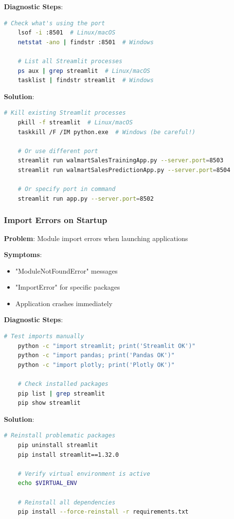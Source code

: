 \textbf{Diagnostic Steps}:
\begin{lstlisting}[language=bash,basicstyle=\color{blue}]
	# Check what's using the port
	lsof -i :8501  # Linux/macOS
	netstat -ano | findstr :8501  # Windows
	
	# List all Streamlit processes
	ps aux | grep streamlit  # Linux/macOS
	tasklist | findstr streamlit  # Windows
\end{lstlisting}

\textbf{Solution}:
\begin{lstlisting}[language=bash,basicstyle=\color{blue}]
	# Kill existing Streamlit processes
	pkill -f streamlit  # Linux/macOS
	taskkill /F /IM python.exe  # Windows (be careful!)
	
	# Or use different port
	streamlit run walmartSalesTrainingApp.py --server.port=8503
	streamlit run walmartSalesPredictionApp.py --server.port=8504
	
	# Or specify port in command
	streamlit run app.py --server.port=8502
\end{lstlisting}

\subsubsection{Import Errors on Startup}

\textbf{Problem}: Module import errors when launching applications

\textbf{Symptoms}:
\begin{itemize}
	\item "ModuleNotFoundError" messages
	\item "ImportError" for specific packages
	\item Application crashes immediately
\end{itemize}

\textbf{Diagnostic Steps}:
\begin{lstlisting}[language=bash,basicstyle=\color{blue}]
	# Test imports manually
	python -c "import streamlit; print('Streamlit OK')"
	python -c "import pandas; print('Pandas OK')"
	python -c "import plotly; print('Plotly OK')"
	
	# Check installed packages
	pip list | grep streamlit
	pip show streamlit
\end{lstlisting}

\textbf{Solution}:
\begin{lstlisting}[language=bash,basicstyle=\color{blue}]
	# Reinstall problematic packages
	pip uninstall streamlit
	pip install streamlit==1.32.0
	
	# Verify virtual environment is active
	echo $VIRTUAL_ENV
	
	# Reinstall all dependencies
	pip install --force-reinstall -r requirements.txt
\end{lstlisting}

